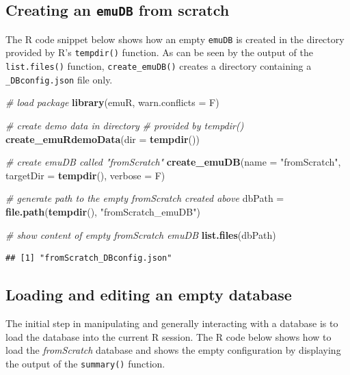 \documentclass[]{book}
\newenvironment{Shaded}{\begin{snugshade}}{\end{snugshade}}
\newcommand{\CommentTok}[1]{\textcolor[rgb]{0.56,0.35,0.01}{\textit{#1}}}
\newcommand{\DataTypeTok}[1]{\textcolor[rgb]{0.13,0.29,0.53}{#1}}
\newcommand{\KeywordTok}[1]{\textcolor[rgb]{0.13,0.29,0.53}{\textbf{#1}}}
\newcommand{\NormalTok}[1]{#1}
\newcommand{\StringTok}[1]{\textcolor[rgb]{0.31,0.60,0.02}{#1}}
\begin{document}
\hypertarget{creating-an-emudb-from-scratch}{%
\subsection{\texorpdfstring{Creating an \texttt{emuDB} from scratch}{Creating an emuDB from scratch}}\label{creating-an-emudb-from-scratch}}

The R code snippet below shows how an empty \texttt{emuDB} is created in the directory provided by R's \texttt{tempdir()} function. As can be seen by the output of the \texttt{list.files()} function, \texttt{create\_emuDB()} creates a directory containing a \texttt{\_DBconfig.json} file only.

\begin{Shaded}
\begin{Highlighting}[]
\CommentTok{# load package}
\KeywordTok{library}\NormalTok{(emuR, }\DataTypeTok{warn.conflicts =}\NormalTok{ F)}

\CommentTok{# create demo data in directory }
\CommentTok{# provided by tempdir()}
\KeywordTok{create_emuRdemoData}\NormalTok{(}\DataTypeTok{dir =} \KeywordTok{tempdir}\NormalTok{())}

\CommentTok{# create emuDB called "fromScratch"}
\KeywordTok{create_emuDB}\NormalTok{(}\DataTypeTok{name =} \StringTok{"fromScratch"}\NormalTok{,}
             \DataTypeTok{targetDir =} \KeywordTok{tempdir}\NormalTok{(),}
             \DataTypeTok{verbose =}\NormalTok{ F)}

\CommentTok{# generate path to the empty fromScratch created above}
\NormalTok{dbPath =}\StringTok{ }\KeywordTok{file.path}\NormalTok{(}\KeywordTok{tempdir}\NormalTok{(), }\StringTok{"fromScratch_emuDB"}\NormalTok{)}

\CommentTok{# show content of empty fromScratch emuDB}
\KeywordTok{list.files}\NormalTok{(dbPath)}
\end{Highlighting}
\end{Shaded}

\begin{verbatim}
## [1] "fromScratch_DBconfig.json"
\end{verbatim}

\hypertarget{loading-and-editing-an-empty-database}{%
\subsection{Loading and editing an empty database}\label{loading-and-editing-an-empty-database}}

The initial step in manipulating and generally interacting with a database is to load the database into the current R session. The R code below shows how to load the \emph{fromScratch} database and shows the empty configuration by displaying the output of the \texttt{summary()} function.
\end{document}
